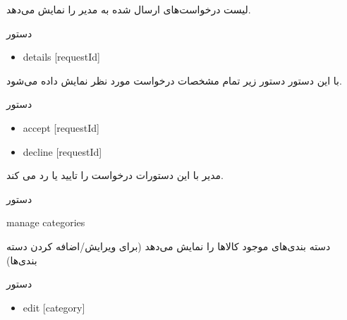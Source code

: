 \documentclass[]{article}
\begin{document}
لیست درخواست‌های ارسال شده به مدیر را نمایش می‌دهد.



\begin{mybox}[colback=brilliantlavender]{دستور}

\begin{latin}

\begin{itemize}[label = {$\Rightarrow$}]

\item
details [requestId]

\end{itemize}

\end{latin}

\end{mybox}

با این دستور دستور زیر تمام مشخصات درخواست مورد نظر نمایش داده می‌شود.


\begin{mybox}[colback=brilliantlavender]{دستور}


\begin{latin}

\begin{itemize}[label = {$\Rightarrow$}]

\item
accept [requestId]

\item
decline [requestId]

\end{itemize}

\end{latin}

\end{mybox}

مدیر با این دستورات درخواست را تایید یا رد می کند.

\hrulefill

\newpage

\begin{mybox}[colback=yellow]{دستور}

\begin{latin}

manage categories

\end{latin}

\end{mybox}

دسته بندی‌های موجود کالاها را نمایش می‌دهد (برای ویرایش/اضافه کردن دسته بندی‌ها)


\begin{mybox}[colback=brilliantlavender]{دستور}

\begin{latin}

\begin{itemize}[label = {$\Rightarrow$}]

\item
edit [category]

\end{itemize}

\end{latin}

\end{mybox}
\end{document}
